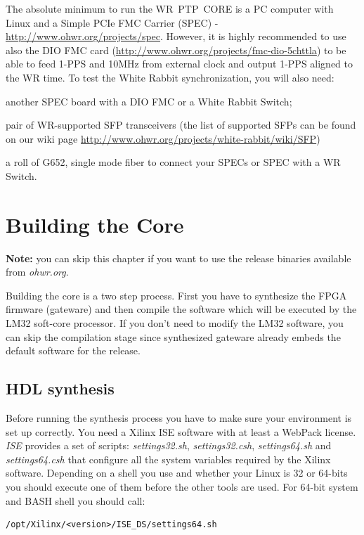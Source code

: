 \documentclass[a4paper, 12pt]{article}
\newcommand{\codeHook}[1]{\mbox{\ttfamily\MakeTextUppercase{#1}}}
\begin{document}
The absolute minimum to run the \codeHook{wr ptp core} is a PC computer with
Linux and a Simple PCIe \codeHook{fmc} Carrier
(\codeHook{spec}) - \url{http://www.ohwr.org/projects/spec}. However, it is highly
recommended to use also the \codeHook{dio} \codeHook{fmc} card (\url{http://www.ohwr.org/projects/fmc-dio-5chttla})
to be able to feed 1-PPS and 10MHz from external clock and output 1-PPS aligned
to the WR time. To test the White Rabbit synchronization, you will also need:
\begin{itemize*}
\item another \codeHook{spec} board with a \codeHook{dio} \codeHook{fmc} or a White Rabbit Switch;
\item pair of \codeHook{wr}-supported \codeHook{sfp} transceivers (the list of supported
\codeHook{sfp}s can be found on our wiki page \url{http://www.ohwr.org/projects/white-rabbit/wiki/SFP})
\item a roll of G652, single mode fiber to connect your \codeHook{spec}s or \codeHook{spec}
with a \codeHook{wr} Switch.
\end{itemize*}

\section{Building the Core}
\label{Building the Core}

\textbf{Note:} you can skip this chapter if you want to use the release binaries
available from \textit{ohwr.org}.

\vspace{1em}
Building the core is a two step process. First you have to
synthesize the FPGA firmware (gateware) and then compile the software which
will be executed by the \codeHook{lm32} soft-core processor. If you don't need to
modify the \codeHook{lm32} software, you can skip the compilation stage since
synthesized gateware already embeds the default software for the release.

\subsection{HDL synthesis}
\label{HDL synthesis}

Before running the synthesis process you have to make sure your environment is
set up correctly. You need a Xilinx ISE software with at least a WebPack
license. \textit{ISE} provides a set of scripts: \textit{settings32.sh},
\textit{settings32.csh}, \textit{settings64.sh} and \textit{settings64.csh} that configure all
the system variables required by the Xilinx software. Depending on a shell you
use and whether your Linux is 32 or 64-bits you should execute one of them
before the other tools are used. For 64-bit system and BASH shell you should
call:
\begin{lstlisting}
/opt/Xilinx/<version>/ISE_DS/settings64.sh
\end{lstlisting}
\end{document}
